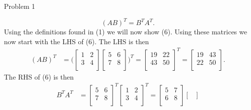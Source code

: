 \begin{problem}{Problem 1}
\begin{highlight}[Solution]
        \begin{equation}
            (AB)^{T} = B^{T}A^{T}.
        \end{equation}
        Using the definitions found in (1) we will now show (6). Using these matrices we now start with the LHS of (6). The LHS is then
        \begin{align*}
            (AB)^{T} & = 
            \biggl(
                \begin{bmatrix}
                    1 & 2 \\
                    3 & 4 \\
                \end{bmatrix}
                \begin{bmatrix}
                    5 & 6 \\
                    7 & 8 \\
                \end{bmatrix}
            \biggr)^{T}
            = 
            \begin{bmatrix}
                19 & 22 \\
                43 & 50 \\
            \end{bmatrix}^{T}
            = 
            \begin{bmatrix}
                19 & 43 \\
                22 & 50 \\
            \end{bmatrix}.
        \end{align*}
        The RHS of (6) is then
        \begin{align*}
            B^{T}A^{T} & = 
            \begin{bmatrix}
                5 & 6 \\
                7 & 8 \\
            \end{bmatrix}^{T}
            \begin{bmatrix}
                1 & 2 \\
                3 & 4 \\
            \end{bmatrix}^{T}
            = 
            \begin{bmatrix}
                5 & 7 \\
                6 & 8 \\
            \end{bmatrix}
            \begin{bmatrix}

\end{bmatrix}
\end{align*}
\end{highlight}
\end{problem}

